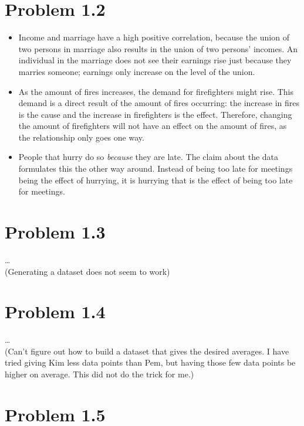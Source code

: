\documentclass[a4paper]{article}
\begin{document}
\section*{Problem 1.2}
\begin{itemize}
    \item Income and marriage have a high positive correlation, because the union of two persons in marriage also results in the union of two persons' incomes.
    An individual in the marriage does not see their earnings rise just because they marries someone; 
    earnings only increase on the level of the union.
    \item As the amount of fires increases, the demand for firefighters might rise. 
    This demand is a direct result of the amount of fires occurring: the increase in fires is the cause and the increase in firefighters is the effect.
    Therefore, changing the amount of firefighters will not have an effect on the amount of fires, as the relationship only goes one way.
    \item People that hurry do so \textit{because} they are late. 
    The claim about the data formulates this the other way around. 
    Instead of being too late for meetings being the effect of hurrying, 
    it is hurrying that is the effect of being too late for meetings.
\end{itemize}

\section*{Problem 1.3}
\dots\\
(Generating a dataset does not seem to work)

\section*{Problem 1.4}
\dots\\
(Can't figure out how to build a dataset that gives the desired averages. I have tried giving Kim less data points than Pem, but having those few data points be higher on average. This did not do the trick for me.)

\section*{Problem 1.5}
\end{document}
